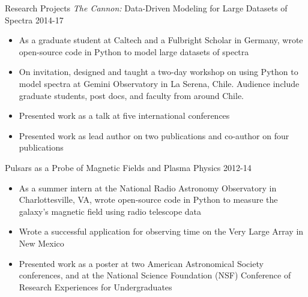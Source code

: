 \documentclass{resume} %
\begin{document}
\begin{rSection}{Research Projects}
\emph{The Cannon:} Data-Driven Modeling for Large Datasets of Spectra
\hfill 2014-17
\begin{itemize}
  \item
    As a graduate student at Caltech and a Fulbright Scholar in Germany,
    wrote open-source code in Python to model large datasets of spectra
  \item
    On invitation, designed and taught a two-day workshop on using Python to
    model spectra at Gemini Observatory in La Serena, Chile. 
    Audience include graduate students, post docs, and faculty from
    around Chile.
  \item
    Presented work as a talk at five international conferences
  \item
    Presented work as lead author on two publications and 
    co-author on four publications
\end{itemize}

Pulsars as a Probe of Magnetic Fields and Plasma Physics
\hfill 2012-14
\begin{itemize}
  \item As a summer intern at the National Radio Astronomy Observatory 
    in Charlottesville, VA, wrote open-source code in Python to measure the 
    galaxy's magnetic field using radio telescope data
  \item Wrote a successful application for observing time on the 
    Very Large Array in New Mexico
  \item Presented work as a poster at two
    American Astronomical Society conferences,
    and at the National Science Foundation (NSF) Conference of 
    Research Experiences for Undergraduates
\end{itemize}

\end{rSection}

\end{document}
